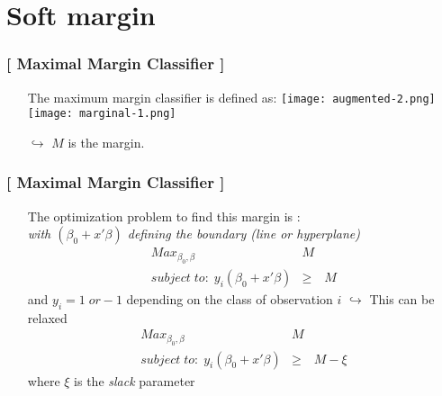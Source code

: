 \documentclass[xcolor=x11names,compress]{beamer}
\renewcommand{\(}{\begin{columns}}
\renewcommand{\)}{\end{columns}}
\newcommand{\<}[1]{\begin{column}{#1}}
\renewcommand{\>}{\end{column}}
\begin{document}
\section{Soft margin}

\begin{frame}
\frametitle{\textcolor{brique}{[ Maximal Margin Classifier ]}}
\pause
\begin{itemize}[<+->]
    \item[] The maximum margin classifier is defined as:
      {\texttt{[image: augmented-2.png]} \\ }
      {\texttt{[image: marginal-1.png]} \\ }
    \item[$\hookrightarrow$] $M$ is the margin.
\end{itemize}
\end{frame}


\begin{frame}
\frametitle{\textcolor{brique}{[ Maximal Margin Classifier ]}}
\pause
\begin{itemize}[<+->]
    \item[] The optimization problem to find this margin is :\\
     {\emph{with $(\beta_0 +x'\beta)$ defining the boundary (line or hyperplane) }\\}
     {\begin{eqnarray*}
                Max_{\beta_0, \beta} & M & \\
                subject\; to:\; y_i(\beta_0 +x' \beta) &\geq &  M
               \end{eqnarray*}
               }
     {and $y_i = 1 \; or -1$ depending on the class of observation $i$ }
     {$\hookrightarrow$ This can be relaxed  \\ }
     {\begin{eqnarray*}
                Max_{\beta_0, \beta} & M & \\
                subject\; to:\; y_i(\beta_0 +x' \beta) &\geq &  M - \xi
               \end{eqnarray*}
               }
    {where $\xi$  is the \textit{slack} parameter}
\end{itemize}
\end{frame}
\end{document}

